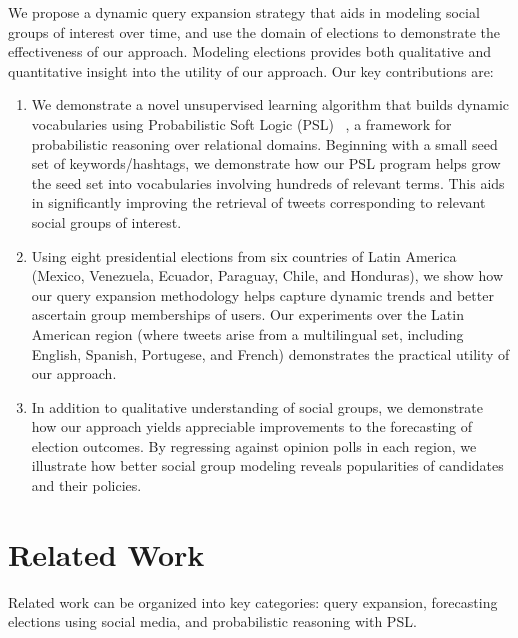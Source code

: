 We propose a dynamic query expansion strategy that aids in modeling social groups of interest over time, and
use the domain of elections to demonstrate the effectiveness of our approach. Modeling elections provides both
qualitative and quantitative insight into the utility of our approach.
Our key contributions are:
\begin{enumerate}
\item We demonstrate
a novel unsupervised learning algorithm that builds dynamic vocabularies using Probabilistic Soft Logic (PSL) ~\cite{kimmig2012short}, a framework for probabilistic reasoning over relational domains.
Beginning with a small seed set of keywords/hashtags, we demonstrate how our PSL program helps
grow the seed set into 
vocabularies involving hundreds of relevant terms. This aids in significantly improving the retrieval of tweets
corresponding to relevant
social groups of interest.
\item Using eight presidential elections from six countries of Latin America (Mexico, Venezuela, Ecuador, Paraguay, Chile, and Honduras), we show how our query expansion methodology helps capture dynamic trends and
better ascertain group memberships of users. Our %
experiments over the Latin American region (where tweets
arise from a multilingual set, including English, Spanish, Portugese, and French) demonstrates the practical utility
of our approach.
\item In addition to qualitative understanding of social groups, we demonstrate how our approach yields
appreciable improvements to the forecasting of election outcomes. By regressing against opinion polls in each region,
we illustrate how better social group modeling reveals popularities of candidates and their policies.
\end{enumerate}

\section{Related Work}
Related work can be organized into key categories: query expansion, forecasting elections using social media,
and probabilistic reasoning with PSL.

